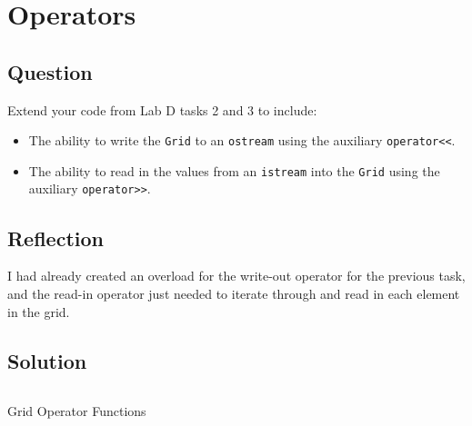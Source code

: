 \section{Operators}

    \subsection*{Question}
        Extend your code from Lab D tasks 2 and 3 to include:
        \begin{itemize}
            \item The ability to write the \texttt{Grid} to an \texttt{ostream} using the auxiliary \texttt{operator<<}.
            \item The ability to read in the values from an \texttt{istream} into the \texttt{Grid} using the auxiliary \texttt{operator>>}.
        \end{itemize}
    
    \subsection*{Reflection}
        I had already created an overload for the write-out operator for the previous task,
        and the read-in operator just needed to iterate through and read in each element in the grid.


    \subsection*{Solution}
        \begin{listing}[H]
            \inputminted[firstline=62]{cpp}{../Tasks/01-Operators/Grid.cpp}
            \caption{Grid Operator Functions}
        \end{listing}